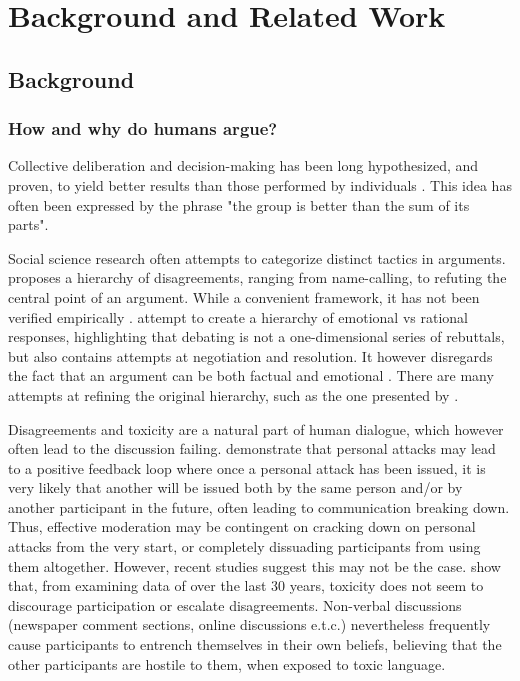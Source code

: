 %
\chapter{Background and Related Work}
\label{sec:related}

\section{Background}
\label{sec:related:sec1}


\subsection{How and why do humans argue?}
\label{sec:background:arguments-how}

Collective deliberation and decision-making has been long hypothesized, and proven, to yield better results than those performed by individuals \cite{david-collaborative, stefan-dissent}. This idea has often been expressed by the phrase "the group is better than the sum of its parts". 

Social science research often attempts to categorize distinct tactics in arguments. \citet{graham2008disagree} proposes a hierarchy of disagreements, ranging from name-calling, to refuting the central point of an argument.  While a convenient framework, it has not been verified empirically \cite{dekock2022disagree}. \citet{walker-etal-2012-corpus} attempt to create a hierarchy of emotional vs rational responses, highlighting that debating is not a one-dimensional series of rebuttals, but also contains attempts at negotiation and resolution. It however disregards the fact that an argument can be both factual and emotional \cite{dekock2022disagree}. There are many attempts at refining the original hierarchy, such as the one presented by \citet{benesch2016counterspeech}.

Disagreements and toxicity are a natural part of human dialogue, which however often lead to the discussion failing. \citet{dekock2022disagree} demonstrate that personal attacks may lead to a positive feedback loop where once a personal attack has been issued, it is very likely that another will be issued both by the same person and/or by another participant in the future, often leading to communication breaking down. Thus, effective moderation may be contingent on cracking down on personal attacks from the very start, or completely dissuading participants from using them altogether. However, recent studies suggest this may not be the case. \citet{Avalle2024PersistentIP} show that, from examining data of over the last 30 years, toxicity does not seem to discourage participation or escalate disagreements. Non-verbal discussions (newspaper comment sections, online discussions e.t.c.) nevertheless frequently cause participants to entrench themselves in their own beliefs, believing that the other participants are hostile to them, when exposed to toxic language.

